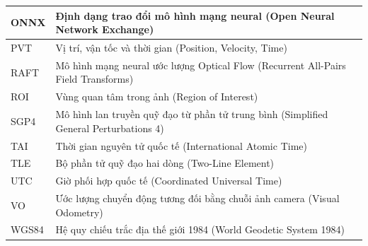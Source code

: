 \documentclass[../DoAn.tex]{subfiles}
\begin{document}
\begin{longtable}{|p{2.2cm}|p{11.7cm}|}
ONNX & Định dạng trao đổi mô hình mạng neural (Open Neural Network Exchange) \\ \hline
PVT & Vị trí, vận tốc và thời gian (Position, Velocity, Time) \\ \hline
RAFT & Mô hình mạng neural ước lượng Optical Flow (Recurrent All-Pairs Field Transforms) \\ \hline
ROI & Vùng quan tâm trong ảnh (Region of Interest) \\ \hline
SGP4 & Mô hình lan truyền quỹ đạo từ phần tử trung bình (Simplified General Perturbations 4) \\ \hline
TAI & Thời gian nguyên tử quốc tế (International Atomic Time) \\ \hline
TLE & Bộ phần tử quỹ đạo hai dòng (Two-Line Element) \\ \hline
UTC & Giờ phối hợp quốc tế (Coordinated Universal Time) \\ \hline
VO & Ước lượng chuyển động tương đối bằng chuỗi ảnh camera (Visual Odometry) \\ \hline
WGS84 & Hệ quy chiếu trắc địa thế giới 1984 (World Geodetic System 1984) \\ \hline
\end{longtable}
\end{document}

